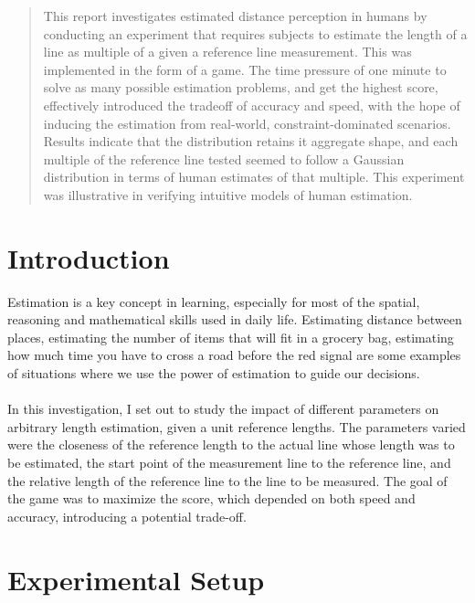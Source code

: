 \documentclass[12pt]{article}
\begin{document}
\maketitle

\begin{abstract}
This report investigates estimated distance perception in humans by conducting an experiment that requires subjects to estimate the length of a line as multiple of a given a reference line measurement. This was implemented in the form of a game. The time pressure of one minute to solve as many possible estimation problems, and get the highest score, effectively introduced the tradeoff of accuracy and speed,  with the hope of inducing the estimation from real-world, constraint-dominated scenarios. Results indicate that the distribution retains it aggregate shape, and each multiple of the reference line tested seemed to follow a Gaussian distribution in terms of human estimates of that multiple. This experiment was illustrative in verifying intuitive models of human estimation. 
\end{abstract}

\section{Introduction}\label{introduction}
Estimation is a key concept in learning, especially for most of the spatial, reasoning and mathematical skills used in daily life. Estimating distance between places, estimating the number of items that will fit in a grocery bag, estimating how much time you have to cross a road before the red signal are some examples of situations where we use the power of estimation to guide our decisions. 
\\ \\
In this investigation, I set out to study the impact of different parameters on arbitrary length estimation, given a unit reference lengths. The parameters varied were the closeness of the reference length to the actual line whose length was to be estimated, the start point of the measurement line to the reference line, and the relative length of the reference line to the line to be measured. The goal of the game was to maximize the score, which depended on both speed and accuracy, introducing a potential trade-off.   

\section{Experimental Setup}\label{experimental setup}
\end{document}
